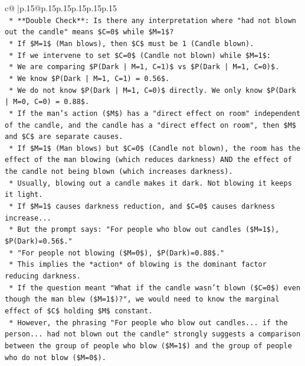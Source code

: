 \documentclass{article}
\begin{document}
{\begin{supertabular}{c@{$\;$}|p{.15\linewidth}@{}p{.15\linewidth}p{.15\linewidth}p{.15\linewidth}p{.15\linewidth}p{.15\linewidth}}
{{{\\ 
\texttt{    *   **Double Check**: Is there any interpretation where "had not blown out the candle" means \$C=0\$ while \$M=1\$?} \\
\texttt{        *   If \$M=1\$ (Man blows), then \$C\$ must be 1 (Candle blown).} \\
\texttt{        *   If we intervene to set \$C=0\$ (Candle not blown) while \$M=1\$:} \\
\texttt{            *   We are comparing \$P(Dark | M=1, C=1)\$ vs \$P(Dark | M=1, C=0)\$.} \\
\texttt{            *   We know \$P(Dark | M=1, C=1) = 0.56\$.} \\
\texttt{            *   We do not know \$P(Dark | M=1, C=0)\$ directly. We only know \$P(Dark | M=0, C=0) = 0.88\$.} \\
\texttt{            *   If the man's action (\$M\$) has a "direct effect on room" independent of the candle, and the candle has a "direct effect on room", then \$M\$ and \$C\$ are separate causes.} \\
\texttt{            *   If \$M=1\$ (Man blows) but \$C=0\$ (Candle not blown), the room has the effect of the man blowing (which reduces darkness) AND the effect of the candle not being blown (which increases darkness).} \\
\texttt{            *   Usually, blowing out a candle makes it dark. Not blowing it keeps it light.} \\
\texttt{            *   If \$M=1\$ causes darkness reduction, and \$C=0\$ causes darkness increase...} \\
\texttt{            *   But the prompt says: "For people who blow out candles (\$M=1\$), \$P(Dark)=0.56\$."} \\
\texttt{            *   "For people not blowing (\$M=0\$), \$P(Dark)=0.88\$."} \\
\texttt{            *   This implies the *action* of blowing is the dominant factor reducing darkness.} \\
\texttt{            *   If the question meant "What if the candle wasn't blown (\$C=0\$) even though the man blew (\$M=1\$)?", we would need to know the marginal effect of \$C\$ holding \$M\$ constant.} \\
\texttt{            *   However, the phrasing "For people who blow out candles... if the person... had not blown out the candle" strongly suggests a comparison between the group of people who blow (\$M=1\$) and the group of people who do not blow (\$M=0\$).} \\
}}}
\end{supertabular}}
\end{document}
